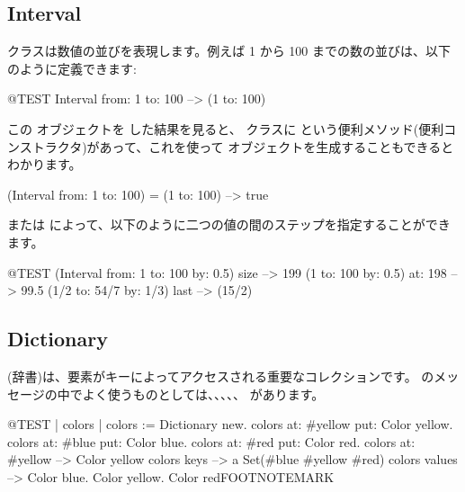 \documentclass[a4paper,10pt,twoside]{book}
\begin{document}

\subsection{Interval}
 クラスは数値の並びを表現します。例えば 1 から 100 までの数の並びは、以下のように定義できます:%
\begin{code}{@TEST}
Interval from: 1 to: 100 --> (1 to: 100)
\end{code}

\noindent
この  オブジェクトを  した結果を見ると、 クラスに  という便利メソッド(便利コンストラクタ)があって、これを使って  オブジェクトを生成することもできるとわかります。

\begin{code}{}
(Interval from: 1 to: 100) = (1 to: 100) --> true
\end{code}

 または  によって、以下のように二つの値の間のステップを指定することができます。

\begin{code}{@TEST}
(Interval from: 1 to: 100 by: 0.5) size --> 199
(1 to: 100 by: 0.5) at: 198 --> 99.5
(1/2 to: 54/7 by: 1/3) last --> (15/2)
\end{code}

\subsection{Dictionary}
 (辞書)は、要素がキーによってアクセスされる重要なコレクションです。
のメッセージの中でよく使うものとしては、、、、、 があります。

\begin{code}{@TEST | colors |}
colors := Dictionary new.
colors at: #yellow put: Color yellow.
colors at: #blue put: Color blue.
colors at: #red put: Color red.
colors at: #yellow --> Color yellow
colors keys          --> a Set(#blue #yellow #red)
colors values       --> {Color blue. Color yellow. Color red}FOOTNOTEMARK
\end{code}
\end{document}
